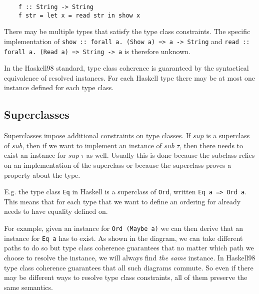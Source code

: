 \begin{verbatim}
    f :: String -> String
    f str = let x = read str in show x
\end{verbatim}

There may be multiple types that satisfy the type class constraints.
The specific implementation of \texttt{show :: forall a. (Show a) => a -> String} and \texttt{read :: forall a. (Read a) => String -> a} is therefore unknown.

In the Haskell98 standard, type class coherence is guaranteed by the syntactical equivalence of resolved instances.
For each Haskell type there may be at most one instance defined for each type class.


\subsection{Superclasses}

Superclasses impose additional constraints on type classes.
If $sup$ is a superclass of $sub$, then if we want to implement an instance of $sub \;\tau$, then there needs to exist an instance for $sup \;\tau$ as well.
Usually this is done because the subclass relies on an implementation of the superclass or because the superclass proves a property about the type.

E.g. the type class \texttt{Eq} in Haskell is a superclass of \texttt{Ord}, written \texttt{Eq a => Ord a}.
This means that for each type that we want to define an ordering for already needs to have equality defined on.

For example, given an instance for \texttt{Ord (Maybe a)} we can then derive that an instance for \texttt{Eq a} has to exist.
As shown in the diagram, we can take different paths to do so but type class coherence guarantees that no matter which path we choose to resolve the instance, we will always find \emph{the same} instance.
In Haskell98 type class coherence guarantees that all such diagrams commute.
So even if there may be different ways to resolve type class constraints, all of them preserve the same semantics.

